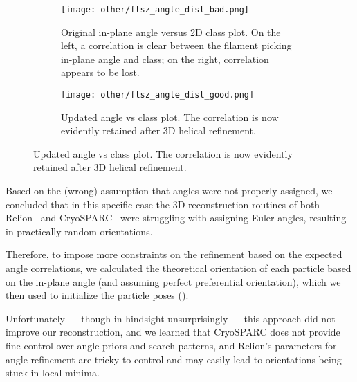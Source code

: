 \begin{figure}
    \centering
    \begin{subfigure}[B]{\textwidth}
        \centering
        \texttt{[image: other/ftsz\_angle\_dist\_bad.png]}
        \caption{Original in-plane angle versus 2D class plot. On the left, a correlation is clear between the filament picking in-plane angle and class; on the right, correlation appears to be lost.}
        \label{fig:ftsz_filament_angles_bad}
    \end{subfigure}
    \begin{subfigure}[B]{\textwidth}
        \centering
        \texttt{[image: other/ftsz\_angle\_dist\_good.png]}
        \caption{Updated angle vs class plot. The correlation is now evidently retained after 3D helical refinement.}
        \label{fig:ftsz_filament_angles_good}
    \end{subfigure}%
    \label{fig:ftsz_filament_angles}
\end{figure}

Based on the (wrong) assumption that angles were not properly assigned, we concluded that in this specific case the 3D reconstruction routines of both Relion~\cite{scheresRELIONImplementationBayesian2012} and CryoSPARC~\cite{punjaniCryoSPARCAlgorithmsRapid2017} were struggling with assigning Euler angles, resulting in practically random orientations.

Therefore, to impose more constraints on the refinement based on the expected angle correlations, we calculated the theoretical orientation of each particle based on the in-plane angle (and assuming perfect preferential orientation), which we then used to initialize the particle poses ().

Unfortunately --- though in hindsight unsurprisingly --- this approach did not improve our reconstruction, and we learned that CryoSPARC does not provide fine control over angle priors and search patterns, and Relion's parameters for angle refinement are tricky to control and may easily lead to orientations being stuck in local minima.

\FloatBarrier

